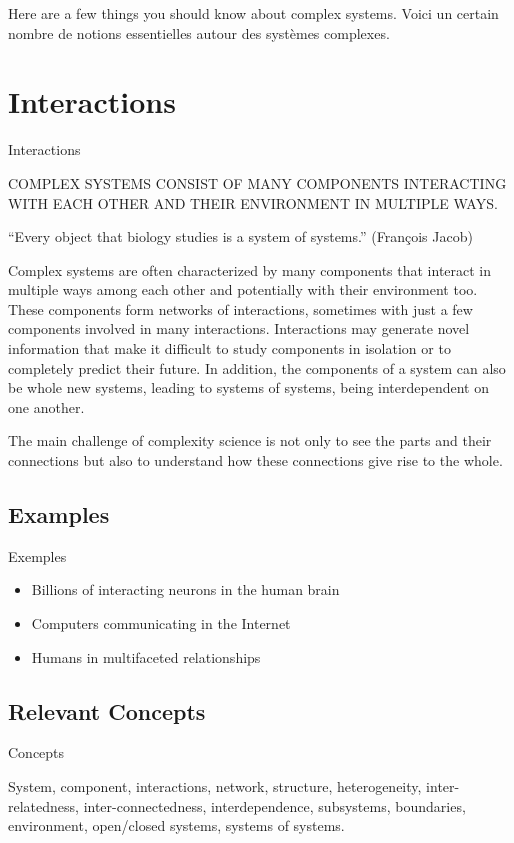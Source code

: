 \documentclass[12pt]{article}
\begin{document}
Here are a few things you should know about complex systems.
Voici un certain nombre de notions essentielles autour des systèmes complexes.




\section{Interactions}{Interactions}


COMPLEX SYSTEMS CONSIST OF MANY COMPONENTS INTERACTING WITH EACH OTHER AND THEIR ENVIRONMENT IN MULTIPLE WAYS.


``Every object that biology studies is a system of systems.'' (François Jacob)

Complex systems are often characterized by many components that interact in multiple ways among each other and potentially with their environment too. These components form networks of interactions, sometimes with just a few components involved in many interactions. Interactions may generate novel information that make it difficult to study components in isolation or to completely predict their future. In addition, the components of a system can also be whole new systems, leading to systems of systems, being interdependent on one another.

The main challenge of complexity science is not only to see the parts and their connections but also to understand how these connections give rise to the whole.


\subsection*{Examples}{Exemples}

\begin{itemize}
	\item Billions of interacting neurons in the human brain
	\item Computers communicating in the Internet
	\item Humans in multifaceted relationships
\end{itemize}


\subsection*{Relevant Concepts}{Concepts}


System, component, interactions, network, structure, heterogeneity, inter-relatedness, inter-connectedness, interdependence, subsystems, boundaries, environment, open/closed systems, systems of systems.
\end{document}
